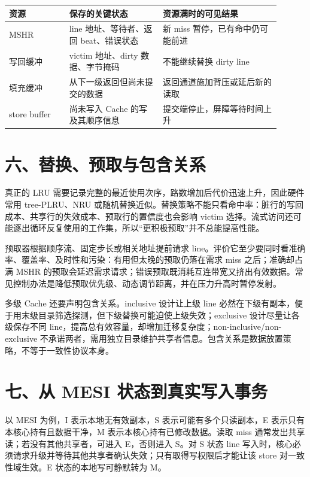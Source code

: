\begin{longtable}{L{0.2\linewidth}L{0.31\linewidth}L{0.39\linewidth}}
\toprule
资源 & 保存的关键状态 & 资源满时的可见结果 \\
\midrule
MSHR & line 地址、等待者、返回 beat、错误状态 & 新 miss 暂停，已有命中仍可能前进 \\\tablerowrule
写回缓冲 & victim 地址、dirty 数据、字节掩码 & 不能继续替换 dirty line \\\tablerowrule
填充缓冲 & 从下一级返回但尚未提交的数据 & 返回通道施加背压或延后新的读取 \\\tablerowrule
store buffer & 尚未写入 Cache 的写及其顺序信息 & 提交端停止，屏障等待时间上升 \\
\bottomrule
\end{longtable}

\section{六、替换、预取与包含关系}

真正的 LRU 需要记录完整的最近使用次序，路数增加后代价迅速上升，因此硬件常用 tree-PLRU、NRU 或随机替换近似。替换策略不能只看命中率：脏行的写回成本、共享行的失效成本、预取行的置信度也会影响 victim 选择。流式访问还可能逐出循环反复使用的工作集，所以“更积极预取”并不总能提高性能。

预取器根据顺序流、固定步长或相关地址提前请求 line。评价它至少要同时看准确率、覆盖率、及时性和污染：有用但太晚的预取仍落在需求 miss 之后；准确却占满 MSHR 的预取会延迟需求请求；错误预取既消耗互连带宽又挤出有效数据。常见控制办法是降低预取优先级、动态调节距离，并在压力升高时暂停发射。

多级 Cache 还要声明包含关系。inclusive 设计让上级 line 必然在下级有副本，便于用末级目录筛选探测，但下级替换可能迫使上级失效；exclusive 设计尽量让各级保存不同 line，提高总有效容量，却增加迁移复杂度；non-inclusive/non-exclusive 不承诺两者，需用独立目录维护共享者信息。包含关系是数据放置策略，不等于一致性协议本身。

\section{七、从 MESI 状态到真实写入事务}

以 MESI 为例，I 表示本地无有效副本，S 表示可能有多个只读副本，E 表示只有本核心持有且数据干净，M 表示本核心持有已修改数据。读取 miss 通常发出共享读；若没有其他共享者，可进入 E，否则进入 S。对 S 状态 line 写入时，核心必须请求升级并等待其他共享者确认失效；只有取得写权限后才能让该 store 对一致性域生效。E 状态的本地写可静默转为 M。

